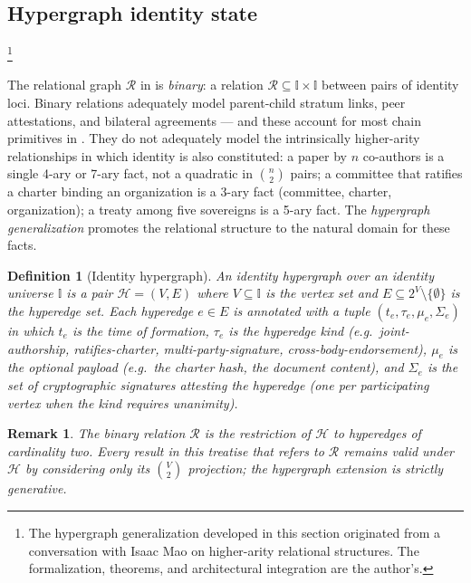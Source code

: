 \documentclass[11pt,a4paper,parskip=half-,DIV=12,headings=standardclasses]{scrartcl}
\theoremstyle{ncthm}
\theoremstyle{ncdef}
\newtheorem{definition}[theorem]{Definition}
\newtheorem{remark}[theorem]{Remark}
\newcommand{\relations}{\mathcal{R}}
\begin{document}
\subsection{Hypergraph identity state}\label{subsec:hypergraph}\footnote{The hypergraph generalization developed in this section originated from a conversation with Isaac Mao on higher-arity relational structures. The formalization, theorems, and architectural integration are the author's.}

The relational graph $\relations$ in  is
\emph{binary}: a relation $\relations \subseteq \mathbb{I} \times \mathbb{I}$
between pairs of identity loci. Binary relations adequately model
parent-child stratum links, peer attestations, and bilateral
agreements --- and these account for most chain primitives in
. They do not adequately model the
intrinsically higher-arity relationships in which identity is also
constituted: a paper by $n$ co-authors is a single 4-ary or 7-ary fact,
not a quadratic in $\binom{n}{2}$ pairs; a committee that ratifies a
charter binding an organization is a 3-ary fact (committee, charter,
organization); a treaty among five sovereigns is a 5-ary fact. The
\emph{hypergraph generalization} promotes the relational structure to
the natural domain for these facts.

\begin{definition}[Identity hypergraph]\label{def:hypergraph}
An identity hypergraph over an identity universe $\mathbb{I}$ is a pair
$\mathcal{H} = (V, E)$ where $V \subseteq \mathbb{I}$ is the vertex
set and $E \subseteq 2^V \setminus \{\emptyset\}$ is the hyperedge
set. Each hyperedge $e \in E$ is annotated with a tuple
$(t_e, \tau_e, \mu_e, \Sigma_e)$ in which $t_e$ is the time of
formation, $\tau_e$ is the hyperedge kind (e.g.\
\textsf{joint-authorship}, \textsf{ratifies-charter},
\textsf{multi-party-signature}, \textsf{cross-body-endorsement}),
$\mu_e$ is the optional payload (e.g.\ the charter hash, the document
content), and $\Sigma_e$ is the set of cryptographic signatures
attesting the hyperedge (one per participating vertex when the kind
requires unanimity).
\end{definition}

\begin{remark}
The binary relation $\relations$ is the restriction of $\mathcal{H}$
to hyperedges of cardinality two. Every result in this treatise that
refers to $\relations$ remains valid under $\mathcal{H}$ by considering
only its $\binom{V}{2}$ projection; the hypergraph extension is strictly
generative.
\end{remark}
\end{document}
